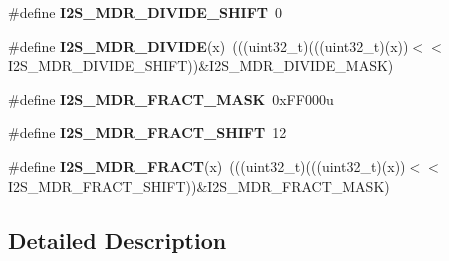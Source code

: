 \begin{DoxyCompactItemize}
\item 
\#define {\bfseries I2\+S\+\_\+\+M\+D\+R\+\_\+\+D\+I\+V\+I\+D\+E\+\_\+\+S\+H\+I\+FT}~0\hypertarget{group__I2S__Register__Masks_ga96fc58c33527f6dba2be28151ecdb6b2}{}\label{group__I2S__Register__Masks_ga96fc58c33527f6dba2be28151ecdb6b2}

\item 
\#define {\bfseries I2\+S\+\_\+\+M\+D\+R\+\_\+\+D\+I\+V\+I\+DE}(x)~(((uint32\+\_\+t)(((uint32\+\_\+t)(x))$<$$<$I2\+S\+\_\+\+M\+D\+R\+\_\+\+D\+I\+V\+I\+D\+E\+\_\+\+S\+H\+I\+FT))\&I2\+S\+\_\+\+M\+D\+R\+\_\+\+D\+I\+V\+I\+D\+E\+\_\+\+M\+A\+SK)\hypertarget{group__I2S__Register__Masks_ga12b79478094d1367a54d08fd0372546d}{}\label{group__I2S__Register__Masks_ga12b79478094d1367a54d08fd0372546d}

\item 
\#define {\bfseries I2\+S\+\_\+\+M\+D\+R\+\_\+\+F\+R\+A\+C\+T\+\_\+\+M\+A\+SK}~0x\+F\+F000u\hypertarget{group__I2S__Register__Masks_ga0686acbd342566fcf227b91122b901cc}{}\label{group__I2S__Register__Masks_ga0686acbd342566fcf227b91122b901cc}

\item 
\#define {\bfseries I2\+S\+\_\+\+M\+D\+R\+\_\+\+F\+R\+A\+C\+T\+\_\+\+S\+H\+I\+FT}~12\hypertarget{group__I2S__Register__Masks_gab4cc6d27bd245719343b0e868ffb4bb4}{}\label{group__I2S__Register__Masks_gab4cc6d27bd245719343b0e868ffb4bb4}

\item 
\#define {\bfseries I2\+S\+\_\+\+M\+D\+R\+\_\+\+F\+R\+A\+CT}(x)~(((uint32\+\_\+t)(((uint32\+\_\+t)(x))$<$$<$I2\+S\+\_\+\+M\+D\+R\+\_\+\+F\+R\+A\+C\+T\+\_\+\+S\+H\+I\+FT))\&I2\+S\+\_\+\+M\+D\+R\+\_\+\+F\+R\+A\+C\+T\+\_\+\+M\+A\+SK)\hypertarget{group__I2S__Register__Masks_ga1a70c2cf16e7bfff509b937099b4914b}{}\label{group__I2S__Register__Masks_ga1a70c2cf16e7bfff509b937099b4914b}

\end{DoxyCompactItemize}


\subsection{Detailed Description}
